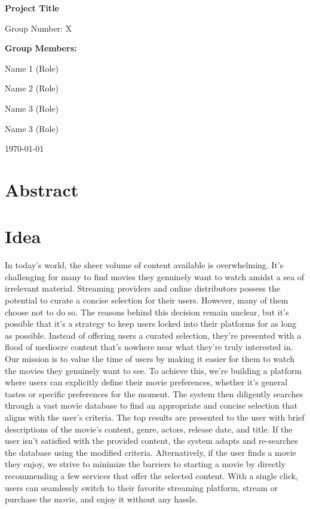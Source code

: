 \documentclass[11pt,a4paper]{article}
\begin{document}
  \begin{titlepage}
    \begin{center}
      \vspace*{2cm}
      {\huge\bfseries Project Title\par}
      \vspace{2cm}
      {\Large Group Number: X\par}
      \vspace{1.5cm}
      {\large\bfseries Group Members:\par}
      \vspace{0.5cm}
      {\large
      Name 1 (Role)\par
      Name 2 (Role)\par
      Name 3 (Role)\par
      Name 3 (Role)\par
      }
      \vfill
      {\large \today\par}
    \end{center}
  \end{titlepage}

  \tableofcontents
  \newpage

  \section{Abstract}

  \section{Idea}

  In today’s world, the sheer volume of content available is overwhelming.
  It’s challenging for many to find movies they genuinely want to watch amidst a sea of irrelevant material.
  Streaming providers and online distributors possess the potential to curate a concise selection for their users.
  However, many of them choose not to do so.
  The reasons behind this decision remain unclear, but it’s possible that it’s a strategy to keep users locked into their platforms for as long as possible.
  Instead of offering users a curated selection, they’re presented with a flood of mediocre content that’s nowhere near what they’re truly interested in.
  Our mission is to value the time of users by making it easier for them to watch the movies they genuinely want to see.
  To achieve this, we’re building a platform where users can explicitly define their movie preferences, whether it’s general tastes or specific preferences for the moment.
  The system then diligently searches through a vast movie database to find an appropriate and concise selection that aligns with the user’s criteria.
  The top results are presented to the user with brief descriptions of the movie’s content, genre, actors, release date, and title.
  If the user isn’t satisfied with the provided content, the system adapts and re-searches the database using the modified criteria.
  Alternatively, if the user finds a movie they enjoy, we strive to minimize the barriers to starting a movie by directly recommending a few services that offer the selected content.
  With a single click, users can seamlessly switch to their favorite streaming platform, stream or purchase the movie, and enjoy it without any hassle.
\end{document}
